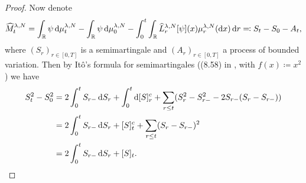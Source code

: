\documentclass{article}
\begin{document}
\begin{proof}
Now denote
\begin{equation}\label{eq:M=S-A}
    \widehat{M}_t^{\lambda,N} = \int_\potspace \psi \odif{\mu_t^{\lambda, N}} - \int_\potspace \psi \odif{\mu_0^{\lambda, N}} - \int_0^t \int_\potspace \widehat{L}_r^{\lambda, N} [\psi](x) \mu_{r}^{\lambda, N}(\odif{x}) \odif{r}
    \eqqcolon S_t - S_0 - A_t,
\end{equation}
where $(S_r)_{r\in[0,T]}$ is a semimartingale and $(A_r)_{r\in[0,T]}$ a process of bounded variation.
Then by Itô's formula for semimartingales ((8.58) in \cite[236]{klebaner_introduction_2012}, with $f(x) \coloneqq x^2$) we have
\begin{equation}\label{eq:S^2-q-var-rel}
\begin{split}
    S_t^2 - S_0^2
    &= 2 \int_0^t S_{r-} \odif{S_r} + \int_0^t \odif{\sbr{S}_r^c}
    + \sum_{r \leq t} \br{ S_r^2 - S_{r-}^2  - 2 S_{r-} (S_r - S_{r-}) } \\
    &= 2 \int_0^t S_{r-} \odif{S_r} + \sbr{S}_t^c
    + \sum_{r \leq t} \br{ S_r - S_{r-} }^2 \\
    &= 2 \int_0^t S_{r-} \odif{S_r} + \sbr{S}_t.
\end{split}
\end{equation}


\end{proof}
\end{document}
